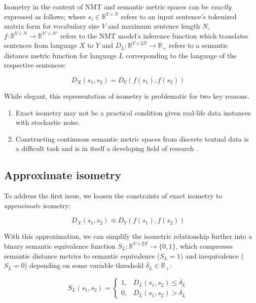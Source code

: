 \documentclass[11pt,a4paper]{article}
\begin{document}
Isometry in the context of NMT and semantic metric spaces can be \textit{exactly} expressed as follows; where $s_i \in \mathbb{R}^{V \times N}$ refers to an input sentence's tokenized matrix form for vocabulary size $V$ and maximum sentence length $N$, $f: \mathbb{R}^{V \times N} \to \mathbb{R}^{V' \times N'}$ refers to the NMT model's inference function which translates sentences from language $X$ to $Y$ and $D_L: \mathbb{R}^{V \times 2N} \to \mathbb{R}_+$ refers to a semantic distance metric function for language $L$ corresponding to the language of the respective sentences:

\begin{equation}  
  \label{exact_isometry_eqn}
  D_X(s_1,s_2) = D_Y(f(s_1),f(s_2))
\end{equation}

While elegant, this representation of isometry is problematic for two key reasons.

\begin{enumerate}
\item Exact isometry may not be a practical condition given real-life data instances with stochastic noise.
\item Constructing continuous semantic metric spaces from discrete textual data is a difficult task and is in itself a developing field of research \cite{cer2017semeval, michel2019evaluation}.
\end{enumerate}

\subsection{Approximate isometry}

To address the first issue, we loosen the constraints of exact isometry to \textit{approximate} isometry:

\begin{equation} 
  \label{approx_isometry_eqn}
  D_X(s_1,s_2) \approx D_Y(f(s_1),f(s_2)) 
\end{equation}

With this approximation, we can simplify the isometric relationship further into a binary semantic equivalence function $S_L: \mathbb{R}^{V \times 2N} \to \{0,1\}$, which compresses semantic distance metrics to semantic equivalence ($S_L=1$) and inequivalence ($S_L=0$) depending on some variable threshold $\delta_L \in \mathbb{R}_+$:

\begin{equation}
  \label{bounded_isometry_eqn}
  S_L(s_1,s_2) =
  \begin{cases}
    1, &D_L(s_1,s_2) \leq \delta_L \\
    0, &D_L(s_1,s_2) > \delta_L
  \end{cases}
\end{equation}
\end{document}
